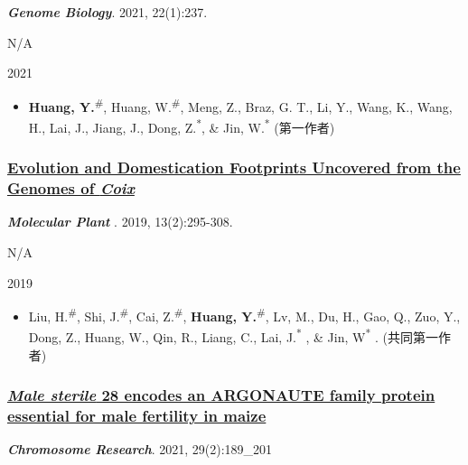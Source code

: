 \documentclass[]{article}
\providecommand{\tightlist}{%
  \setlength{\itemsep}{0pt}\setlength{\parskip}{0pt}}
\begin{document}
\textbf{\emph{Genome Biology}}. 2021, 22(1):237.

N/A

2021

\begin{itemize}
\tightlist
\item
  \textbf{Huang, Y.}\textsuperscript{\#}, Huang, W.\textsuperscript{\#},
  Meng, Z., Braz, G. T., Li, Y., Wang, K., Wang, H., Lai, J., Jiang, J.,
  Dong, Z.\textsuperscript{*}, \& Jin, W.\textsuperscript{*} (第一作者)
\end{itemize}

\hypertarget{evolution-and-domestication-footprints-uncovered-from-the-genomes-of-coix}{%
\subsubsection{\texorpdfstring{\href{http://dx.doi.org/10.1016/j.molp.2019.11.009}{Evolution
and Domestication Footprints Uncovered from the Genomes of
\emph{Coix}}}{Evolution and Domestication Footprints Uncovered from the Genomes of Coix}}\label{evolution-and-domestication-footprints-uncovered-from-the-genomes-of-coix}}

\textbf{\emph{Molecular Plant }}. 2019, 13(2):295-308.

N/A

2019

\begin{itemize}
\tightlist
\item
  Liu, H.\textsuperscript{\#}, Shi, J.\textsuperscript{\#}, Cai,
  Z.\textsuperscript{\#}, \textbf{Huang, Y.}\textsuperscript{\#}, Lv,
  M., Du, H., Gao, Q., Zuo, Y., Dong, Z., Huang, W., Qin, R., Liang, C.,
  Lai, J.\textsuperscript{*} , \& Jin, W\textsuperscript{*} .
  (共同第一作者)
\end{itemize}

\hypertarget{male-sterile-28-encodes-an-argonaute-family-protein-essential-for-male-fertility-in-maize}{%
\subsubsection{\texorpdfstring{\href{_https://doi.org/10.1007/s10577-021-09653-6}{\emph{Male
sterile} 28 encodes an ARGONAUTE family protein essential for male
fertility in
maize}}{Male sterile 28 encodes an ARGONAUTE family protein essential for male fertility in maize}}\label{male-sterile-28-encodes-an-argonaute-family-protein-essential-for-male-fertility-in-maize}}

\textbf{\emph{Chromosome Research}}. 2021, 29(2):189\_201
\end{document}
